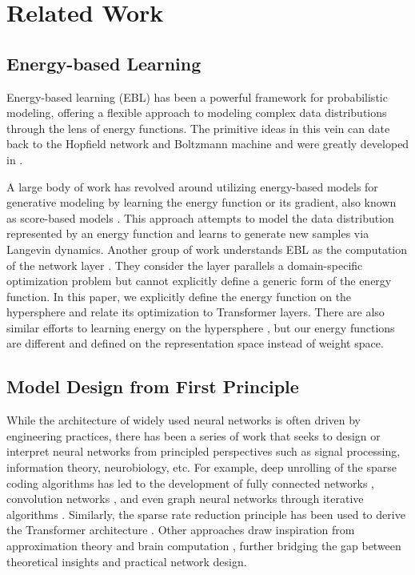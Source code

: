 \section{Related Work}
\label{section:label}

\subsection{Energy-based Learning}
Energy-based learning (EBL) has been a powerful framework for probabilistic modeling, offering a flexible approach to modeling complex data distributions through the lens of energy functions.
The primitive ideas in this vein can date back to the Hopfield network \cite{hopfield1982neural} and Boltzmann machine \cite{ackley1985learning} and were greatly developed in \cite{lecun2006tutorial}. 

A large body of work has revolved around utilizing energy-based models for generative modeling by learning the energy function \cite{du2019implicit} or its gradient, also known as score-based models \cite{pmlr-v37-sohl-dickstein15,song2019generative, song2021scorebased}. This approach attempts to model the data distribution represented by an energy function and learns to generate new samples via Langevin dynamics. Another group of work understands EBL as the computation of the network layer \cite{amos2017optnet, agrawal2019differentiable}. They consider the layer parallels a domain-specific optimization problem but cannot explicitly define a generic form of the energy function. In this paper, we explicitly define the energy function on the hypersphere and relate its optimization to Transformer layers. There are also similar efforts to learning energy on the hypersphere \cite{liu2018learning,loshchilov2024ngpt}, but our energy functions are different and defined on the representation space instead of weight space.
\subsection{Model Design from First Principle}
While the architecture of widely used neural networks is often driven by engineering practices, there has been a series of work that seeks to design or interpret neural networks from principled perspectives such as signal processing, information theory, neurobiology, etc. For example, deep unrolling of the sparse coding algorithms has led to the development of fully connected networks \cite{gregor2010learning}, convolution networks \cite{papyan2017convolutional, papyan2018theoretical}, and even graph neural networks through iterative algorithms \cite{yang2021graph}. Similarly, the sparse rate reduction principle has been used to derive the Transformer architecture \cite{yu2023white}. Other approaches draw inspiration from approximation theory \cite{liu2024kan} and brain computation \cite{kozachkov2023building}, further bridging the gap between theoretical insights and practical network design. 


